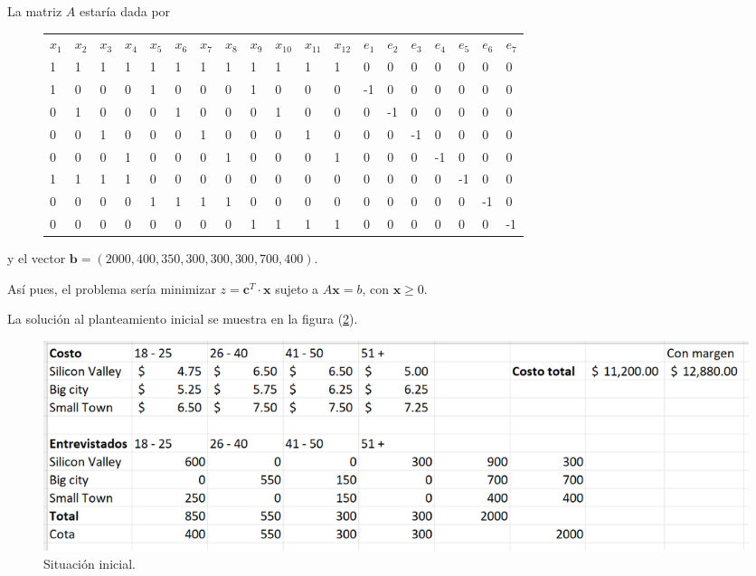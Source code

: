 \documentclass[12pt]{article}
\begin{document}
La matriz $A$ estaría dada por
\begin{figure}[ht]
    \centering
    \begin{tabular}{lllllllllllllllllll}
        $x_1$ & $x_2$ & $x_3$ & $x_4$ & $x_5$ & $x_6$ & $x_7$ & $x_8$ & $x_9$ & $x_{10}$ & $x_{11}$ & $x_{12}$ & $e_1$ & $e_2$ & $e_3$ & $e_4$ & $e_5$ & $e_6$ & $e_7$ \\
        1   & 1   & 1   & 1   & 1   & 1   & 1   & 1   & 1   & 1      & 1      & 1      & 0   & 0   & 0   & 0   & 0   & 0   & 0   \\
        1   & 0   & 0   & 0   & 1   & 0   & 0   & 0   & 1   & 0      & 0      & 0      & -1  & 0   & 0   & 0   & 0   & 0   & 0   \\
        0   & 1   & 0   & 0   & 0   & 1   & 0   & 0   & 0   & 1      & 0      & 0      & 0   & -1  & 0   & 0   & 0   & 0   & 0   \\
        0   & 0   & 1   & 0   & 0   & 0   & 1   & 0   & 0   & 0      & 1      & 0      & 0   & 0   & -1  & 0   & 0   & 0   & 0   \\
        0   & 0   & 0   & 1   & 0   & 0   & 0   & 1   & 0   & 0      & 0      & 1      & 0   & 0   & 0   & -1  & 0   & 0   & 0   \\
        1   & 1   & 1   & 1   & 0   & 0   & 0   & 0   & 0   & 0      & 0      & 0      & 0   & 0   & 0   & 0   & -1  & 0   & 0   \\
        0   & 0   & 0   & 0   & 1   & 1   & 1   & 1   & 0   & 0      & 0      & 0      & 0   & 0   & 0   & 0   & 0   & -1  & 0   \\
        0   & 0   & 0   & 0   & 0   & 0   & 0   & 0   & 1   & 1      & 1      & 1      & 0   & 0   & 0   & 0   & 0   & 0   & -1 
        \end{tabular}
    \label{fig:tabla5}
\end{figure}

y el vector $\pmb{b} = (2000, 400, 350, 300, 300, 300, 700, 400)$.

Así pues, el problema sería minimizar $z = \pmb{c}^T \cdot \pmb{x}$ sujeto a $A \pmb{x} = b$, con $\pmb{x} \geq 0$.

La solución al planteamiento inicial se muestra en la figura (\ref{fig:img1}).
\begin{figure}
    \centering
    \includegraphics[scale=0.4]{imgs/inicial.png} 
    \caption{Situación inicial.}
    \label{fig:img1}   
\end{figure}
\end{document}
